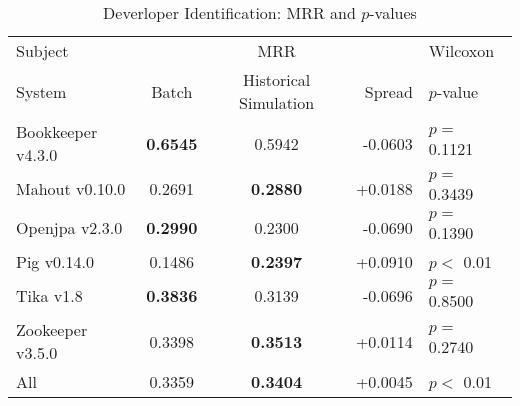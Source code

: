 \begin{table}[t]
\centering
\caption{Deverloper Identification: MRR and $p$-values}
\begin{tabular}{l|ccr|l}
\toprule
Subject & & MRR & & Wilcoxon  \\
System  &  Batch & Historical Simulation & Spread & $p$-value  \\
\midrule
Bookkeeper v4.3.0 & {\bf 0.6545 } & 0.5942 & -0.0603 & $p = $ 0.1121 \\
Mahout v0.10.0 & 0.2691 & {\bf 0.2880 } & +0.0188 & $p = $ 0.3439 \\
Openjpa v2.3.0 & {\bf 0.2990 } & 0.2300 & -0.0690 & $p = $ 0.1390 \\
Pig v0.14.0 & 0.1486 & {\bf 0.2397 } & +0.0910 & $p < $ 0.01 \\
Tika v1.8 & {\bf 0.3836 } & 0.3139 & -0.0696 & $p = $ 0.8500 \\
Zookeeper v3.5.0 & 0.3398 & {\bf 0.3513 } & +0.0114 & $p = $ 0.2740 \\
\midrule
All & 0.3359 & {\bf 0.3404 } & +0.0045 & $p < $ 0.01 \\
\bottomrule
\end{tabular}
\label{table:triage_rq2}
\end{table}
